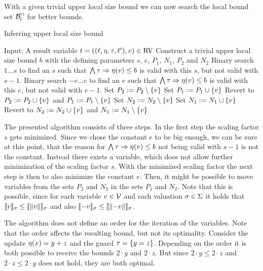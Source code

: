 With a given trivial upper local size bound we can now search the local bound set $\mathcal{B}^\sqcap_l$ for better bounds.

\begin{algorithm}
\caption{Inferring upper local size bound}\label{lsb_algorithm}
\begin{algorithmic}[1]
  \State Input: A result variable $t = ((\ell,\eta,\tau,\ell'),v) \in \text{RV}$
  \State Construct a trivial upper local size bound $b$ with the defining parameters $s$, $e$, $P_1$, $N_1$, $P_2$ and $N_2$
  \State Binary search $1 \dots s$ to find an $s$ such that $\bigwedge \tau \Rightarrow \eta(v) \leq b$ is valid with this $s$, but not valid with $s-1$.
  \State Binary search $-e \dots e$ to find an $e$ such that $\bigwedge \tau \Rightarrow \eta(v) \leq b$ is valid with this $e$, but not valid with $e-1$.
    \State Set $P_2 := P_2 \setminus \lbrace v \rbrace$
      \State Set $P_1 := P_1 \cup \lbrace v \rbrace$
        \State Revert to $P_2 := P_2 \cup \lbrace v \rbrace$ and $P_1 := P_1 \setminus \lbrace v \rbrace$
      \EndIf
    \EndIf
    \State Set $N_2 := N_2 \setminus \lbrace v \rbrace$
      \State Set $N_1 := N_1 \cup \lbrace v \rbrace$
        \State Revert to $N_2 := N_2 \cup \lbrace v \rbrace$ and $N_1 := N_1 \setminus \lbrace v \rbrace$
      \EndIf
    \EndIf
  \EndFor
\end{algorithmic}
\end{algorithm}

The presented algorithm consists of three steps.
In the first step the scaling factor $s$ gets minimized.
Since we chose the constant $e$ to be big enough, we can be sure at this point, that the reason for $\bigwedge \tau \Rightarrow \eta(v) \leq b$ not being valid with $s-1$ is not the constant.
Instead there exists a variable, which does not allow further minimization of the scaling factor $s$.
With the minimized scaling factor the next step is then to also minimize the constant $e$.
Then, it might be possible to move variables from the sets $P_2$ and $N_2$ in the sets $P_1$ and $N_2$.
Note that this is possible, since for each variable $v \in \mathcal{V}$ and each valuation $\sigma \in \Sigma$ it holds that $\llbracket v \rrbracket_{\sigma} \leq \llbracket \left\Vert v\right\Vert \rrbracket_{\sigma}$ and also $\llbracket -v \rrbracket_{\sigma} \leq \llbracket \left\Vert-v\right\Vert \rrbracket_{\sigma}$.

The algorithm does not define an order for the iteration of the variables.
Note that the order affects the resulting bound, but not its optimality.
Consider the update $\eta(x) = y + z$ and the guard $\tau = \lbrace y = z \rbrace$.
Depending on the order it is both possible to receive the bounds $2 \cdot y$ and $2 \cdot z$.
But since $2 \cdot y \leq 2 \cdot z$ and $2 \cdot z \leq 2 \cdot y$ does not hold, they are both optimal.


